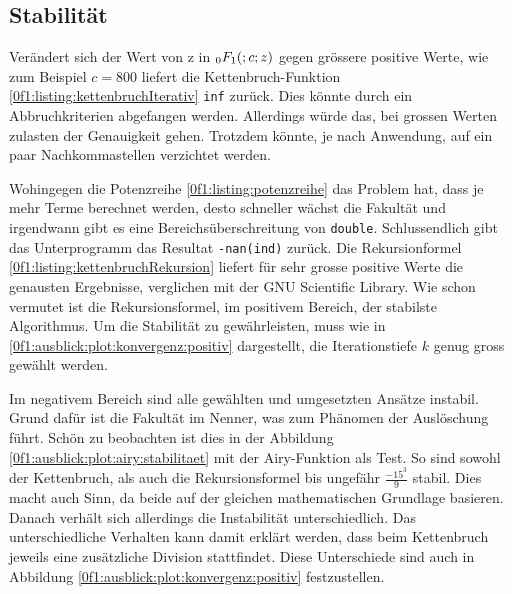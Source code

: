 \subsection{Stabilität
\label{0f1:subsection:Stabilitaet}}
Verändert sich der Wert von z in $\mathstrut_0F_1(;c;z)$ gegen grössere positive Werte, wie zum Beispiel $c = 800$ liefert die Kettenbruch-Funktion \ref{0f1:listing:kettenbruchIterativ} \verb+inf+ zurück. Dies könnte durch ein Abbruchkriterien abgefangen werden. Allerdings würde das, bei grossen Werten zulasten der Genauigkeit gehen. Trotzdem könnte, je nach Anwendung, auf ein paar Nachkommastellen verzichtet werden.

Wohingegen die Potenzreihe \ref{0f1:listing:potenzreihe} das Problem hat, dass je mehr Terme berechnet werden, desto schneller wächst die Fakultät und irgendwann gibt es eine Bereichsüberschreitung von \verb+double+. Schlussendlich gibt das Unterprogramm das Resultat \verb+-nan(ind)+ zurück.
Die Rekursionformel \ref{0f1:listing:kettenbruchRekursion} liefert für sehr grosse positive Werte die genausten Ergebnisse, verglichen mit der GNU Scientific Library. Wie schon vermutet ist die Rekursionsformel, im positivem Bereich, der stabilste Algorithmus. Um die Stabilität zu gewährleisten, muss wie in \ref{0f1:ausblick:plot:konvergenz:positiv} dargestellt, die Iterationstiefe $k$ genug gross gewählt werden.

Im negativem Bereich sind alle gewählten und umgesetzten Ansätze instabil. Grund dafür ist die Fakultät im Nenner, was zum Phänomen der Auslöschung führt.\cite{0f1:SeminarNumerik} Schön zu beobachten ist dies in der Abbildung \ref{0f1:ausblick:plot:airy:stabilitaet} mit der Airy-Funktion als Test. So sind sowohl der Kettenbruch, als auch die Rekursionsformel bis ungefähr $\frac{-15^3}{9}$ stabil. Dies macht auch Sinn, da beide auf der gleichen mathematischen Grundlage basieren. Danach verhält sich allerdings die Instabilität unterschiedlich. Das unterschiedliche Verhalten kann damit erklärt werden, dass beim Kettenbruch jeweils eine zusätzliche Division stattfindet. Diese Unterschiede sind auch in Abbildung \ref{0f1:ausblick:plot:konvergenz:positiv} festzustellen.



